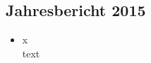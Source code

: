 \subsection{Jahresbericht 2015}
\begin{history}


    \begin{itemize}

        \item[]x\\
        text

    \end{itemize}

\end{history}
